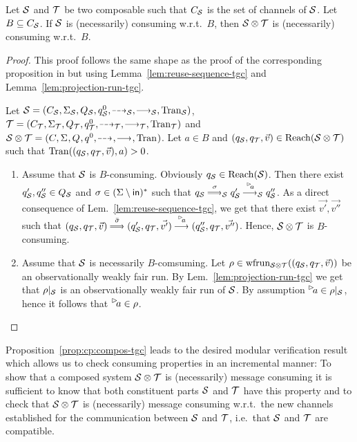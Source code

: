 \begin{proposition}\label{prop:cp:compos-tgc}
   Let $\S$ and $\T$ be two composable \MAIOTSs such that $\chan_\S$ is the set of channels of $\S$. Let $B \subseteq \chan_\S$.
   If $\S$ is (necessarily) consuming w.r.t.\ $B$, then $\S \compos \T$  is (necessarily) consuming w.r.t.\ $B$.
\end{proposition}
\begin{proof}
	This proof follows the same shape as the proof of the corresponding proposition in \cite{TechReportVersion}
but using Lemma~\ref{lem:reuse-sequence-tgc} and Lemma~\ref{lem:projection-run-tgc}.


      Let $\S =  \maiotstup{\S}$, $\T =  \maiotstup{\T}$ and $\S \compos \T = \maiotstup{}$.
    Let $a \in B$ and $(q_\S,q_\T,\vec{v}) \in \reach(\S\compos\T)$ such that $\val((q_\S,q_\T,\vec{v}),a)>0$.
    \begin{enumerate}      
        \item Assume that $\S$ is $B$-consuming. Obviously $q_\S \in \reach(\S)$. 
Then there exist $q'_\S,q''_\S \in Q_\S$ and $\sigma \in (\Sigma \setminus \inset)^*$
such that $q_\S \mustw{\sigma}_\S q'_\S \must{\inact{a}}_\S q''_\S$.
As a direct consequence of Lem.~\ref{lem:reuse-sequence-tgc}, we get that there exist $\vec{v'}, \vec{v''}$ such that
$(q_\S,q_\T,\vec{v}) \mustw{\bar\sigma}  (q'_\S,q_\T,\vec{v'}) \must{\inact{a}}  (q''_\S,q_\T,\vec{v''})$.
Hence, $\S \compos \T$ is $B$-consuming.

        \item Assume that $\S$ is necessarily $B$-comsuming.  Let $\rho \in \frun{\S\compos\T}((q_\S,q_\T,\vec{v}))$
 be an observationally weakly fair run. 
        By Lem.~\ref{lem:projection-run-tgc} we get that $\rho|_\S$ is an observationally weakly fair run of $\S$. By assumption $\inact{a} \in \rho|_\S$, hence it follows that $\inact{a} \in \rho$. 
    \end{enumerate}
\end{proof}

Proposition~\ref{prop:cp:compos-tgc} leads to the desired modular verification result
which allows us to check consuming properties in an incremental manner:
To show that a composed system $\S \compos \T$ is (necessarily) message consuming
it is sufficient to know that both constituent parts $\S$ and $\T$ have this property
and to check that $\S \compos \T$ is (necessarily) message consuming w.r.t.\ the
new channels established for the communication between $\S$ and $\T$, i.e.\ that $\S$ and $\T$
are compatible.


